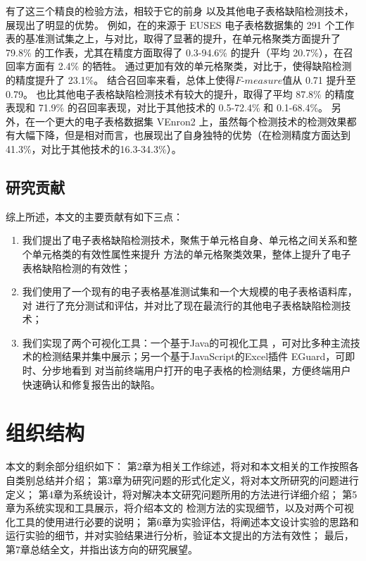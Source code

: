有了这三个精良的检验方法，\wa 相较于它的前身 \cu 以及其他电子表格缺陷检测技术，展现出了明显的优势。
例如，在\cu 的来源于 EUSES \cite{fisher2005euses} 电子表格数据集的 291 个工作表的基准测试集之上，\wa 与\cu 对比，取得了显著的提升，在单元格聚类方面提升了 79.8\% 的工作表，尤其在精度方面取得了 0.3-94.6\% 的提升（平均 20.7\%），在召回率方面有 2.4\% 的牺牲。
\wa 通过更加有效的单元格聚类，对比于\cu，使得缺陷检测的精度提升了 23.1\%。
结合召回率来看，总体上使得$F\text{-}measure$值从 0.71 提升至 0.79。
\wa 也比其他电子表格缺陷检测技术有较大的提升，取得了平均 87.8\% 的精度表现和 71.9\% 的召回率表现，对比于其他技术的 0.5-72.4\% 和 0.1-68.4\%。
另外，在一个更大的电子表格数据集 VEnron2 \cite{xu2017spreadcluster} 上，虽然每个检测技术的检测效果都有大幅下降，但是相对而言，\wa 也展现出了自身独特的优势（在检测精度方面达到 41.3\%，对比于其他技术的16.3-34.3\%）。

\subsection{研究贡献}

综上所述，本文的主要贡献有如下三点：

\begin{enumerate}
    \item 我们提出了电子表格缺陷检测技术\wa ，聚焦于单元格自身、单元格之间关系和整个单元格类的有效性属性来提升 \cu 方法的单元格聚类效果，整体上提升了电子表格缺陷检测的有效性；
    \item 我们使用了一个现有的电子表格基准测试集和一个大规模的电子表格语料库，对 \wa 进行了充分测试和评估，并对比了现在最流行的其他电子表格缺陷检测技术；
    \item 我们实现了两个可视化工具：一个基于Java的可视化工具 \sg ，可对比多种主流技术的检测结果并集中展示；另一个基于JavaScript的Excel插件 EGuard，可即时、分步地看到 \wa 对当前终端用户打开的电子表格的检测结果，方便终端用户快速确认和修复报告出的缺陷。
\end{enumerate}


\section{组织结构}

本文的剩余部分组织如下：
第2章为相关工作综述，将对和本文相关的工作按照各自类别总结并介绍；
第3章为研究问题的形式化定义，将对本文所研究的问题进行定义；
第4章为系统设计，将对解决本文研究问题所用的方法进行详细介绍；
第5章为系统实现和工具展示，将介绍本文的 \wa 检测方法的实现细节，以及对两个可视化工具的使用进行必要的说明；
第6章为实验评估，将阐述本文设计实验的思路和运行实验的细节，并对实验结果进行分析，验证本文提出的方法有效性；
最后，第7章总结全文，并指出该方向的研究展望。